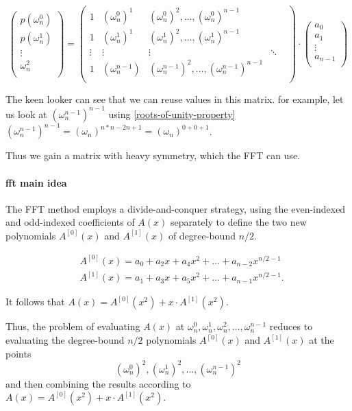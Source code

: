  \label{dft-matrix}
 $$
\begin{pmatrix}
  p(\omega_n^0)\\
  p(\omega_n^1)\\
  \vdots \\
  \omega_n^2\\
\end{pmatrix}
=
\begin{pmatrix}
  1 & (\omega_n^0)^1 & (\omega_n^0)^2 ,\dots ,(\omega_n^0)^{n-1}\\
  1 & (\omega_n^1)^1 & (\omega_n^1)^2, \dots, (\omega_n^1)^{n-1}\\
  \vdots & \vdots & \vdots & \ddots & \\
  1 & (\omega_n^{n-1}) & (\omega_n^{n-1})^2, \dots,(\omega_n^{n-1})^{n-1}\\
 \end{pmatrix}
 \cdot 
\begin{pmatrix}
  a_0\\
  a_1\\
  \vdots \\
  a_{n-1}\\
\end{pmatrix}
 $$

 The keen looker can see that we can reuse values in this matrix.
 for example, let us look at $(\omega_n^{n-1})^{n-1}$ using \ref{roots-of-unity-property}
 $(\omega_n^{n-1})^{n-1} = (\omega_n)^{n*n-2n+1}=(\omega_n)^{0+0+1}$.  

 Thus we gain a matrix with heavy symmetry, which the FFT can use.

\paragraph{fft main idea}
The FFT method employs a divide-and-conquer strategy, 
using the even-indexed and odd-indexed coefficients of $A(x)$
separately to define the two new polynomials $A^{[0]}(x)$ and $A^{[1]}(x)$ of degree-bound $n/2$.

\begin{align}
  &A^{[0]}(x) =  a_0 +a_2x + a_4x^2 + \dots + a_{n-2}x^{n/2-1}\\
  &A^{[1]}(x) =  a_1 +a_3x + a_5x^2 + \dots + a_{n-1}x^{n/2-1}.
\end{align}


It follows that $A(x)=A^{[0]}(x^2) + x\cdot A^{[1]}(x^2)$.

Thus, the problem of evaluating $A(x)$ at 
$\omega_n^0, \omega_n^1, \omega_n^2,\dots, \omega_n^{n-1}$ 
reduces to evaluating the degree-bound $n/2$ polynomials  $A^{[0]}(x)$ and $A^{[1]}(x)$ at the points
$$(\omega_n^0)^2, (\omega_n^1)^2,\dots, (\omega_n^{n-1})^2$$
and then combining the results according to $A(x)=A^{[0]}(x^2) + x\cdot A^{[1]}(x^2)$.


